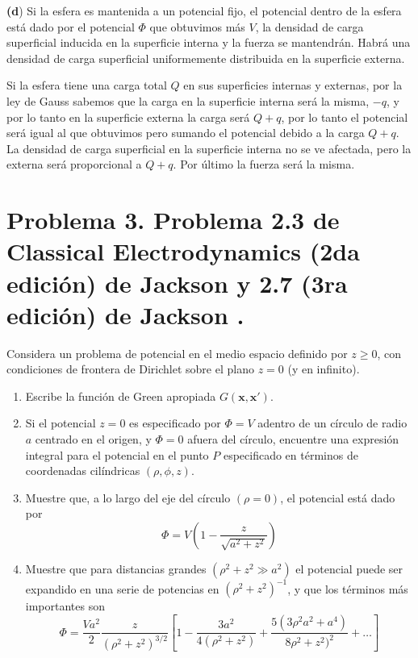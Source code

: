 \documentclass[a4paper,10pt]{article}
\numberwithin{equation}{section}
\begin{document}
\vspace{.3cm}

\textbf{(d}) Si la esfera es mantenida a un potencial fijo, el potencial dentro de 
la esfera está dado por el potencial $\Phi$ que obtuvimos más $V$, la densidad de 
carga superficial inducida en la superficie interna y la fuerza se mantendrán. Habrá 
una densidad de carga superficial uniformemente distribuida en la superficie 
externa.

\vspace{.3cm}

Si la esfera tiene una carga total $Q$ en sus superficies internas y externas, 
por la ley de Gauss sabemos que la carga en la superficie interna será la misma, 
$-q$, y por lo tanto en la superficie externa la carga será $Q+q$, por lo tanto 
el potencial será igual al que obtuvimos pero sumando el potencial debido a la 
carga $Q+q$. La densidad de carga superficial en la superficie interna no se ve 
afectada, pero la externa será proporcional a $Q+q$. Por último la fuerza será 
la misma.

\section{Problema 3. Problema 2.3 de Classical Electrodynamics (2da edición) de Jackson 
\cite{jackson2} y 2.7 (3ra edición) de Jackson \cite{jackson3}.}

Considera un problema de potencial en el medio espacio definido por $z \geq 0$, con 
condiciones de frontera de Dirichlet sobre el plano $z = 0$ (y en infinito).

\begin{enumerate}[label=\textbf{(\alph*)}]
 \item Escribe la función de Green apropiada $G(\mathbf{x},\mathbf{x}')$.
 \item Si el potencial $z = 0$ es especificado por $\Phi = V$ adentro de un círculo 
 de radio $a$ centrado en el origen, y $\Phi = 0$ afuera del círculo, encuentre 
 una expresión integral para el potencial en el punto $P$ especificado en términos 
 de coordenadas cilíndricas $(\rho,\phi,z)$.
 \item Muestre que, a lo largo del eje del círculo $(\rho = 0)$, el potencial está 
 dado por 
 $$
 \Phi = V\left(1 - \frac{z}{\sqrt{a^2+z^2}}\right)
 $$
 \item Muestre que para distancias grandes $(\rho^2 + z^2 \gg a^2)$ el potencial 
 puede ser expandido en una serie de potencias en $(\rho^2 + z^2)^{-1}$, y que 
 los términos más importantes son 
 $$
 \Phi = \frac{Va^2}{2}\frac{z}{(\rho^2 + z^2)^{3/2}}\left[1 - 
 \frac{3a^2}{4(\rho^2 + z^2)} + \frac{5(3\rho^2a^2+a^4)}{8\rho^2 + z^2)^2} 
 + \dots \right]
 $$
\end{enumerate}
\end{document}
